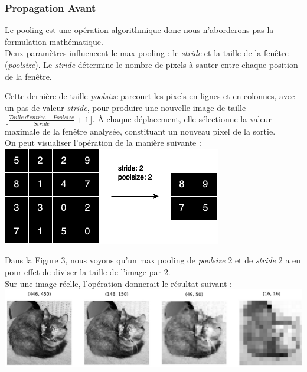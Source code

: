 \begin{multicols}{2}
\subsubsection{Propagation Avant}

Le pooling est une opération algorithmique donc nous n'aborderons pas
la formulation mathématique.\\

Deux paramètres influencent le max pooling : le \textit{stride} et 
la taille de la fenêtre (\textit{poolsize}). Le \textit{stride} détermine 
le nombre de pixels à sauter entre chaque position de la fenêtre.

Cette dernière de taille \textit{poolsize} parcourt les pixels en lignes 
et en colonnes, avec un pas de valeur \textit{stride}, pour produire une nouvelle 
image de taille $\lfloor \frac{Taille \ d’entr \acute{e}e - Poolsize}{Stride} + 1 \rfloor$. 
À chaque déplacement, elle sélectionne la valeur maximale de la fenêtre 
analysée, constituant un nouveau pixel de la sortie.\\

On peut visualiser l'opération de la manière suivante : \\

\includegraphics[width=\columnwidth]{images/forwardpooling.png}
\hfill\break

Dans la Figure 3, nous voyons qu'un max pooling de \textit{poolsize} 2 et 
de \textit{stride} 2 a eu pour effet de diviser la taille de l'image par 2.\\

Sur une image réelle, l'opération donnerait le résultat suivant : \\

\includegraphics[width=\columnwidth]{images/maxpooling2.png}
\hfill\break


\end{multicols}
